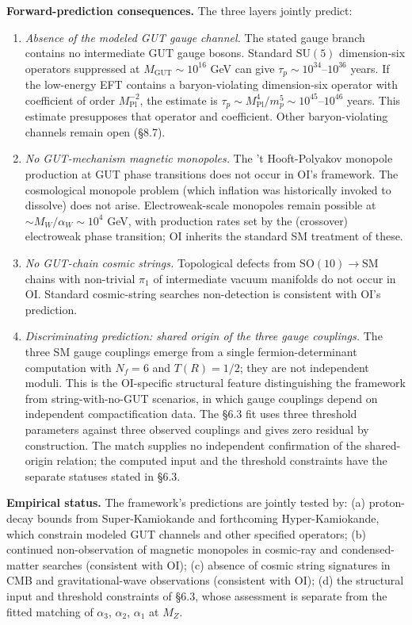 \documentclass[
]{article}
\begin{document}
\textbf{Forward-prediction consequences.} The three layers jointly
predict:

\begin{enumerate}
\def\labelenumi{(\roman{enumi})}
\item
  \emph{Absence of the modeled GUT gauge channel.} The stated gauge
  branch contains no intermediate GUT gauge bosons. Standard
  \(\mathrm{SU}(5)\) dimension-six operators suppressed at
  \(M_{\mathrm{GUT}} \sim 10^{16}\) GeV can give
  \(\tau_p \sim 10^{34}\)--\(10^{36}\) years. If the low-energy EFT
  contains a baryon-violating dimension-six operator with coefficient of
  order \(M_{\mathrm{Pl}}^{-2}\), the estimate is
  \(\tau_p \sim M_{\mathrm{Pl}}^4/m_p^5 \sim 10^{45}\)--\(10^{46}\)
  years. This estimate presupposes that operator and coefficient. Other
  baryon-violating channels remain open (§8.7).
\item
  \emph{No GUT-mechanism magnetic monopoles.} The 't Hooft-Polyakov
  monopole production at GUT phase transitions does not occur in OI's
  framework. The cosmological monopole problem (which inflation was
  historically invoked to dissolve) does not arise. Electroweak-scale
  monopoles remain possible at \(\sim M_W/\alpha_W \sim 10^4\) GeV, with
  production rates set by the (crossover) electroweak phase transition;
  OI inherits the standard SM treatment of these.
\item
  \emph{No GUT-chain cosmic strings.} Topological defects from
  \(\mathrm{SO}(10) \to \mathrm{SM}\) chains with non-trivial \(\pi_1\)
  of intermediate vacuum manifolds do not occur in OI. Standard
  cosmic-string searches non-detection is consistent with OI's
  prediction.
\item
  \emph{Discriminating prediction: shared origin of the three gauge
  couplings.} The three SM gauge couplings emerge from a single
  fermion-determinant computation with \(N_f = 6\) and \(T(R) = 1/2\);
  they are not independent moduli. This is the OI-specific structural
  feature distinguishing the framework from string-with-no-GUT
  scenarios, in which gauge couplings depend on independent
  compactification data. The §6.3 fit uses three threshold parameters
  against three observed couplings and gives zero residual by
  construction. The match supplies no independent confirmation of the
  shared-origin relation; the computed input and the threshold
  constraints have the separate statuses stated in §6.3.
\end{enumerate}

\textbf{Empirical status.} The framework's predictions are jointly
tested by: (a) proton-decay bounds from Super-Kamiokande and forthcoming
Hyper-Kamiokande, which constrain modeled GUT channels and other
specified operators; (b) continued non-observation of magnetic monopoles
in cosmic-ray and condensed-matter searches (consistent with OI); (c)
absence of cosmic string signatures in CMB and gravitational-wave
observations (consistent with OI); (d) the structural input and
threshold constraints of §6.3, whose assessment is separate from the
fitted matching of \(\alpha_3\), \(\alpha_2\), \(\alpha_1\) at \(M_Z\).
\end{document}
